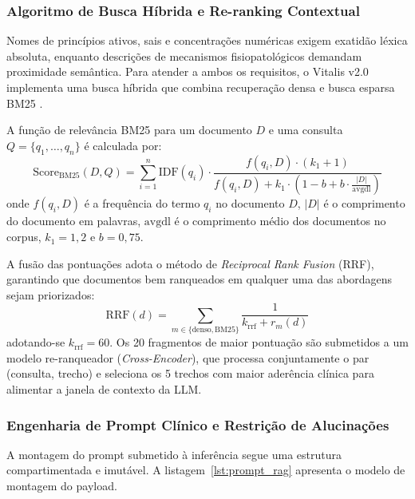 \subsubsection{Algoritmo de Busca Híbrida e Re-ranking Contextual}
Nomes de princípios ativos, sais e concentrações numéricas exigem exatidão léxica absoluta, enquanto descrições de mecanismos fisiopatológicos demandam proximidade semântica. Para atender a ambos os requisitos, o Vitalis v2.0 implementa uma busca híbrida que combina recuperação densa e busca esparsa BM25 \cite{robertson_bm25:2009}.

A função de relevância BM25 para um documento $D$ e uma consulta $Q = \{q_1, \dots, q_n\}$ é calculada por:
\begin{equation}
    \text{Score}_{\text{BM25}}(D, Q) = \sum_{i=1}^{n} \text{IDF}(q_i) \cdot \frac{f(q_i, D) \cdot (k_1 + 1)}{f(q_i, D) + k_1 \cdot \left(1 - b + b \cdot \frac{|D|}{\text{avgdl}}\right)}
\end{equation}
onde $f(q_i, D)$ é a frequência do termo $q_i$ no documento $D$, $|D|$ é o comprimento do documento em palavras, $\text{avgdl}$ é o comprimento médio dos documentos no corpus, $k_1 = 1{,}2$ e $b = 0{,}75$.

A fusão das pontuações adota o método de \textit{Reciprocal Rank Fusion} (RRF), garantindo que documentos bem ranqueados em qualquer uma das abordagens sejam priorizados:
\begin{equation}
    \text{RRF}(d) = \sum_{m \in \{\text{denso}, \text{BM25}\}} \frac{1}{k_{\text{rrf}} + r_m(d)}
\end{equation}
adotando-se $k_{\text{rrf}} = 60$. Os 20 fragmentos de maior pontuação são submetidos a um modelo re-ranqueador (\textit{Cross-Encoder}), que processa conjuntamente o par (consulta, trecho) e seleciona os 5 trechos com maior aderência clínica para alimentar a janela de contexto da LLM.

\subsubsection{Engenharia de Prompt Clínico e Restrição de Alucinações}
A montagem do prompt submetido à inferência segue uma estrutura compartimentada e imutável. A listagem~\ref{lst:prompt_rag} apresenta o modelo de montagem do payload.

